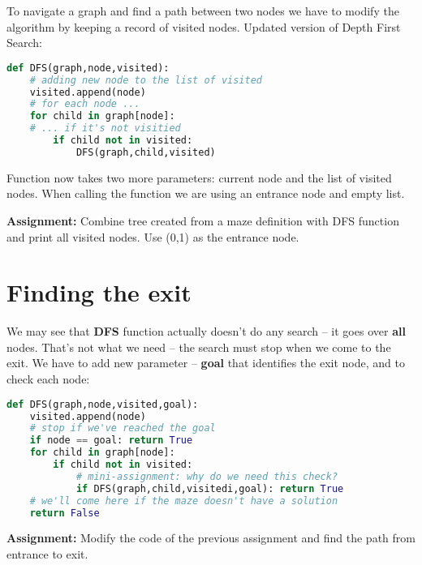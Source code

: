 To navigate a graph and find a path between two nodes we
have to modify the algorithm by keeping a record of visited
nodes. Updated version of Depth First Search:

\begin{lstlisting}[language=Python,style=codelst2,caption={Python: DFS with saving visited nodes}]
def DFS(graph,node,visited):
    # adding new node to the list of visited
    visited.append(node)
    # for each node ...
    for child in graph[node]:
    # ... if it's not visitied
        if child not in visited:
            DFS(graph,child,visited)
\end{lstlisting}

Function now takes two more parameters: current node and the list
of visited nodes. When calling the function we are using
an entrance node and empty list.

\begin{tcolorbox}
\textbf{Assignment:}
Combine tree created from a maze definition with DFS function and
print all visited nodes. Use (0,1) as the entrance node.
\end{tcolorbox}

\section{Finding the exit}

We may see that \textbf{DFS} function actually doesn't do any search --
it goes over \textbf{all} nodes. That's not what we need -- the search must
stop when we come to the exit. We have to add new parameter -- \textbf{goal}
that identifies the exit node, and to check each node:

\begin{lstlisting}[language=Python,style=codelst2,caption={Python: DFS with checking the goal}]
def DFS(graph,node,visited,goal):
    visited.append(node)
    # stop if we've reached the goal
    if node == goal: return True
    for child in graph[node]:
        if child not in visited:
            # mini-assignment: why do we need this check?
            if DFS(graph,child,visitedi,goal): return True
    # we'll come here if the maze doesn't have a solution
    return False
\end{lstlisting}


\begin{tcolorbox}
\textbf{Assignment:}
Modify the code of the previous assignment and find the path from
entrance to exit.
\end{tcolorbox}


